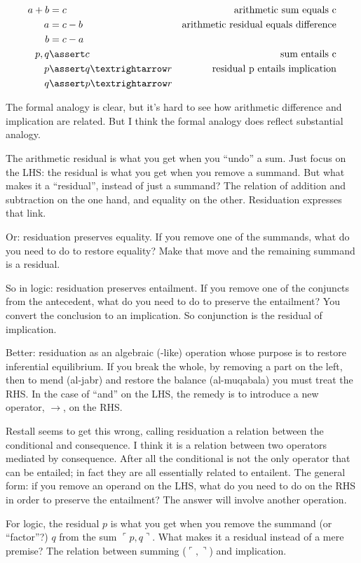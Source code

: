 \documentclass{article}
\begin{document}
\begin{align}
  a+b &= c & \text{arithmetic sum equals c} \\
  a &= c - b & \text{arithmetic residual equals difference} \\
  b &= c - a \\
  p,q &\linfer c & \text{sum entails c} \\
  p &\linfer q→r & \text{residual p entails implication} \\
  q &\linfer p→r
\end{align}

The formal analogy is clear, but it's hard to see how arithmetic
difference and implication are related. But I think the formal analogy
does reflect substantial analogy.

The arithmetic residual is what you get when you ``undo'' a sum. Just
focus on the LHS: the residual is what you get when you remove a
summand. But what makes it a ``residual'', instead of just a summand?
The relation of addition and subtraction on the one hand, and equality
on the other. Residuation expresses that link.

Or: residuation preserves equality. If you remove one of the summands,
what do you need to do to restore equality? Make that move and the remaining summand is a residual.

So in logic: residuation preserves entailment. If you remove one of
the conjuncts from the antecedent, what do you need to do to preserve
the entailment?  You convert the conclusion to an implication. So conjunction is the residual of implication.

Better: residuation as an algebraic (-like) operation whose purpose is
to restore inferential equilibrium. If you break the whole, by
removing a part on the left, then to mend (al-jabr) and restore the
balance (al-muqabala) you must treat the RHS. In the case of ``and''
on the LHS, the remedy is to introduce a new operator, \(→\), on the
RHS.

Restall seems to get this wrong, calling residuation a relation
between the conditional and consequence. I think it is a relation
between two operators mediated by consequence. After all the
conditional is not the only operator that can be entailed; in fact
they are all essentially related to entailent. The general form: if
you remove an operand on the LHS, what do you need to do on the RHS in
order to preserve the entailment? The answer will involve another
operation.

For logic, the residual \(p\) is what you get when you remove the
summand (or ``factor''?) \(q\) from the sum \(\ulcorner
p,q\urcorner\). What makes it a residual instead of a mere premise?
The relation between summing (\(\ulcorner ,\urcorner\)) and
implication.
\end{document}

